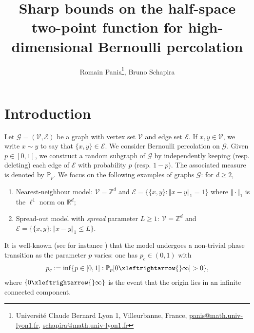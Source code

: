 \documentclass[11pt,a4paper]{article}
\title{Sharp bounds on the half-space two-point function for high-dimensional Bernoulli percolation}
\numberwithin{equation}{section}
\theoremstyle{plain}
\theoremstyle{definition}
\newcommand{\connect}{\xleftrightarrow}
\begin{document}
\author{Romain Panis\footnotemark[1]\footnote{Universit\'e Claude Bernard Lyon 1, Villeurbanne, France, \url{panis@math.univ-lyon1.fr}, \url{schapira@math.univ-lyon1.fr}}\:, Bruno Schapira\footnotemark[1]}

\maketitle


	
	
\section{Introduction}\label{sec:intro}
Let $\mathcal G=(\mathcal V,\mathcal E)$ be a graph with vertex set $\mathcal V$ and edge set $\mathcal E$. If $x,y\in \mathcal V$, we write $x \sim y$ to say that $\{x,y\}\in \mathcal E$. We consider Bernoulli percolation on $\mathcal G$. Given $p\in [0,1]$, we construct a random subgraph of $\mathcal G$ by independently keeping (resp. deleting) each edge of $\mathcal E$ with probability $p$ (resp. $1-p$). The associated measure is denoted by $\mathbb P_p$. We focus on the following examples of graphs $\mathcal G$: for $d\geq 2$,
\begin{enumerate}
	\item[$(i)$] Nearest-neighbour model: $\mathcal V=\mathbb Z^d$ and $\mathcal E=\{\{x,y\}: \Vert x-y\Vert_1=1\}$ where $\Vert \cdot\Vert_1$ is the $\ell^1$ norm on $\mathbb R^d$;
	\item[$(ii)$] Spread-out model with \emph{spread} parameter $L\geq 1$: $\mathcal V=\mathbb Z^d$ and $\mathcal E=\{\{x,y\}: \Vert x-y\Vert_1\leq L\}$.
\end{enumerate}
It is well-known (see for instance \cite{GrimmettPercolation1999}) that the model undergoes a non-trivial phase transition as the parameter $p$ varies:  one has $p_c\in(0,1)$ with 
\begin{equation}
	p_c:=\inf\{p\in [0,1]: \mathbb P_p[0\connect{}\infty]>0\},
\end{equation}
where $\{0\connect{}\infty\}$ is the event that the origin lies in an infinite connected component. 
\end{document}
